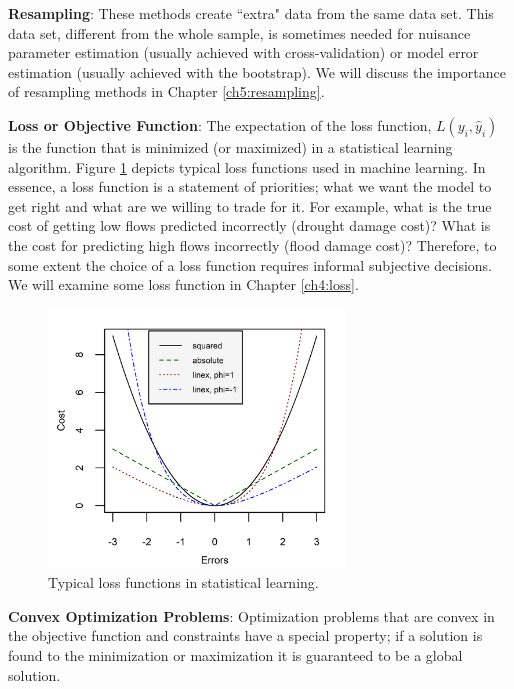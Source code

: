 \textbf{Resampling}: These methods create ``extra" data from the same data set. This data set, different from the whole sample, is sometimes needed for nuisance parameter estimation (usually achieved with cross-validation) or model error estimation (usually achieved with the bootstrap). We will discuss the importance of resampling methods in Chapter \ref{ch5:resampling}. 

\textbf{Loss or Objective Function}: The expectation of the loss function, $L(y_i, \hat{y}_i)$ is the function that is minimized (or maximized) in a statistical learning algorithm. Figure \ref{fig:complossfuncs} depicts typical loss functions used in machine learning. In essence, a loss function is a statement of priorities; what we want the model to get right and what are we willing to trade for it. For example, what is the true cost of getting low flows predicted incorrectly (drought damage cost)? What is the cost for predicting high flows incorrectly (flood damage cost)? Therefore, to some extent the choice of a loss function requires informal subjective decisions. We will examine some loss function in Chapter \ref{ch4:loss}.

\begin{figure}
	\label{fig:complossfuncs}
	\centering
	\includegraphics[width=0.7\textwidth, trim={0 0 0 0}, clip=true]{Plots/rplot_lossfuncs.png}
	\caption{Typical loss functions in statistical learning.}
\end{figure}

\textbf{Convex Optimization Problems}: Optimization problems that are convex in the objective function and constraints have a special property; if a solution is found to the minimization or maximization it is guaranteed to be a global solution. 

